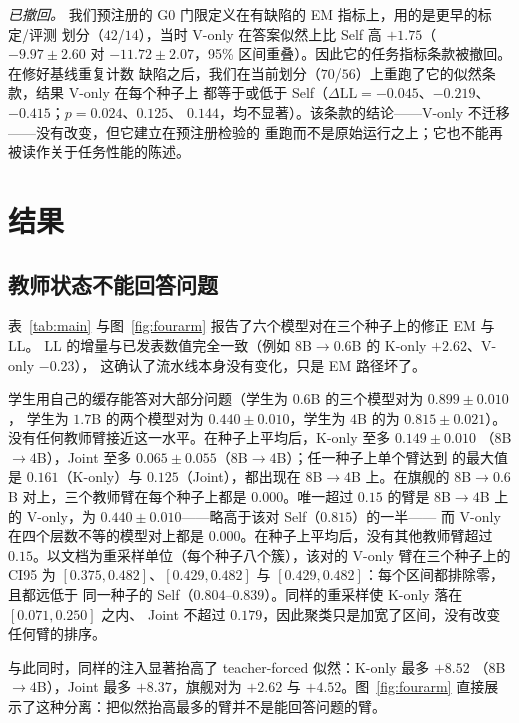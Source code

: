 \documentclass[11pt]{article}
\newcommand{\dll}{\Delta\text{LL}}
\begin{document}
\emph{已撤回。} 我们预注册的 G0 门限定义在有缺陷的 EM 指标上，用的是更早的标定/评测
划分（$42$/$14$），当时 V-only 在答案似然上比 Self 高 $+1.75$（$-9.97 \pm 2.60$ 对
$-11.72 \pm 2.07$，95\% 区间重叠）。因此它的任务指标条款被撤回。在修好基线重复计数
缺陷之后，我们在当前划分（$70$/$56$）上重跑了它的似然条款，结果 V-only 在每个种子上
都等于或低于 Self（$\dll = -0.045$、$-0.219$、$-0.415$；$p = 0.024$、$0.125$、
$0.144$，均不显著）。该条款的结论——V-only 不迁移——没有改变，但它建立在预注册检验的
重跑而不是原始运行之上；它也不能再被读作关于任务性能的陈述。

\section{结果}

\subsection{教师状态不能回答问题}
\label{sec:teacher-states}
表~\ref{tab:main} 与图~\ref{fig:fourarm} 报告了六个模型对在三个种子上的修正 EM 与 LL。
LL 的增量与已发表数值完全一致（例如 $8$B$\to0.6$B 的 K-only $+2.62$、V-only $-0.23$），
这确认了流水线本身没有变化，只是 EM 路径坏了。

学生用自己的缓存能答对大部分问题（学生为 $0.6$B 的三个模型对为 $0.899 \pm 0.010$，
学生为 $1.7$B 的两个模型对为 $0.440 \pm 0.010$，学生为 $4$B 的为 $0.815 \pm 0.021$）。
没有任何教师臂接近这一水平。在种子上平均后，K-only 至多 $0.149 \pm 0.010$
（$8$B$\to4$B），Joint 至多 $0.065 \pm 0.055$（$8$B$\to4$B）；任一种子上单个臂达到
的最大值是 $0.161$（K-only）与 $0.125$（Joint），都出现在 $8$B$\to4$B 上。在旗舰的
$8$B$\to0.6$B 对上，三个教师臂在每个种子上都是 $0.000$。唯一超过 $0.15$ 的臂是
$8$B$\to4$B 上的 V-only，为 $0.440 \pm 0.010$——略高于该对 Self（$0.815$）的一半——
而 V-only 在四个层数不等的模型对上都是 $0.000$。在种子上平均后，没有其他教师臂超过
$0.15$。以文档为重采样单位（每个种子八个簇），该对的 V-only 臂在三个种子上的 CI95 为
$[0.375, 0.482]$、$[0.429, 0.482]$ 与 $[0.429, 0.482]$：每个区间都排除零，且都远低于
同一种子的 Self（$0.804$--$0.839$）。同样的重采样使 K-only 落在 $[0.071, 0.250]$ 之内、
Joint 不超过 $0.179$，因此聚类只是加宽了区间，没有改变任何臂的排序。

与此同时，同样的注入显著抬高了 teacher-forced 似然：K-only 最多 $+8.52$
（$8$B$\to4$B），Joint 最多 $+8.37$，旗舰对为 $+2.62$ 与 $+4.52$。图~\ref{fig:fourarm}
直接展示了这种分离：把似然抬高最多的臂并不是能回答问题的臂。
\end{document}
